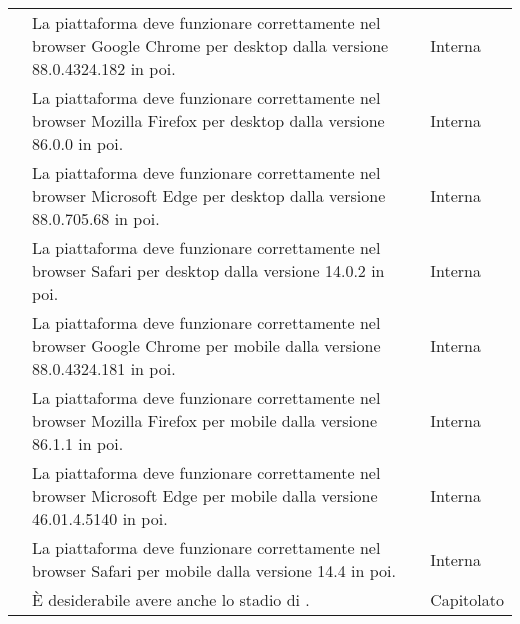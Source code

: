 \begin{longtable}{|c C{9.5cm} C{2.5cm}|}
	 & La piattaforma deve funzionare correttamente nel browser Google Chrome per desktop dalla versione 88.0.4324.182 in poi. & Interna \\

	 & La piattaforma deve funzionare correttamente nel browser Mozilla Firefox per desktop dalla versione 86.0.0 in poi. & Interna \\

	 & La piattaforma deve funzionare correttamente nel browser Microsoft Edge per desktop dalla versione 88.0.705.68 in poi. & Interna \\

	 & La piattaforma deve funzionare correttamente nel browser Safari per desktop dalla versione 14.0.2 in poi. & Interna \\

	 & La piattaforma deve funzionare correttamente nel browser Google Chrome per mobile dalla versione 88.0.4324.181 in poi. & Interna \\

	 & La piattaforma deve funzionare correttamente nel browser Mozilla Firefox per mobile dalla versione 86.1.1 in poi. & Interna \\

	 & La piattaforma deve funzionare correttamente nel browser Microsoft Edge per mobile dalla versione 46.01.4.5140 in poi. & Interna \\

	 & La piattaforma deve funzionare correttamente nel browser Safari per mobile dalla versione 14.4 in poi. & Interna \\
	
	 & È desiderabile avere anche lo stadio di . & Capitolato \\
\end{longtable}
